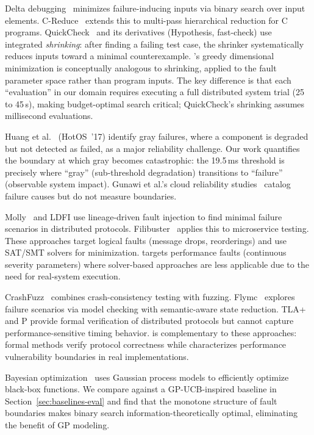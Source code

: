 Delta debugging~\cite{zeller-dd} minimizes failure-inducing inputs via binary
search over input elements. C-Reduce~\cite{creduce} extends this to
multi-pass hierarchical reduction for C programs. QuickCheck~\cite{quickcheck}
and its derivatives (Hypothesis, fast-check) use integrated \emph{shrinking}:
after finding a failing test case, the shrinker systematically reduces inputs
toward a minimal counterexample. \system{}'s greedy dimensional minimization
is conceptually analogous to shrinking, applied to the fault parameter space
rather than program inputs. The key difference is that each ``evaluation''
in our domain requires executing a full distributed system trial (25 to 45\,s),
making budget-optimal search critical; QuickCheck's shrinking assumes
millisecond evaluations.

Huang et al.~\cite{huang-gray-failure} (HotOS~'17) identify gray
failures, where a component is degraded but not detected as failed, as a
major reliability challenge. Our work quantifies the boundary at which gray
becomes catastrophic: the 19.5\,ms threshold is precisely where ``gray''
(sub-threshold degradation) transitions to ``failure'' (observable system
impact). Gunawi et al.'s cloud reliability studies~\cite{gunawi-cbs,lu-cloud}
catalog failure causes but do not measure boundaries.

Molly~\cite{molly} and LDFI use lineage-driven fault injection to find
minimal failure scenarios in distributed protocols. Filibuster~\cite{filibuster}
applies this to microservice testing. These approaches target logical faults
(message drops, reorderings) and use SAT/SMT solvers for minimization.
\system{} targets performance faults (continuous severity parameters)
where solver-based approaches are less applicable due to the need for
real-system execution.

CrashFuzz~\cite{crashfuzz} combines crash-consistency testing with fuzzing.
Flymc~\cite{flymc} explores failure scenarios via model checking with
semantic-aware state reduction. TLA+ and P provide formal verification of
distributed protocols but cannot capture performance-sensitive timing
behavior. \system{} is complementary to these approaches: formal methods
verify protocol correctness while \system{} characterizes performance
vulnerability boundaries in real implementations.

Bayesian optimization~\cite{snoek-bayesopt} uses Gaussian process models to
efficiently optimize black-box functions. We compare against a GP-UCB-inspired
baseline in Section~\ref{sec:baselines-eval} and find that the monotone
structure of fault boundaries makes binary search information-theoretically
optimal, eliminating the benefit of GP modeling.
